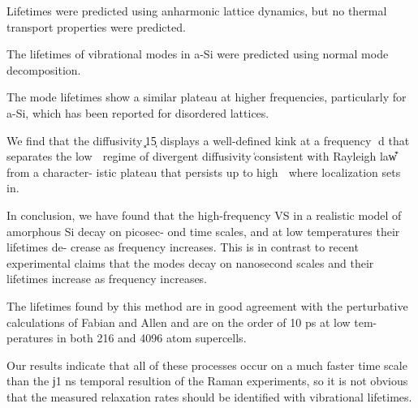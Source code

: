 \documentclass[aps,prb,twocolumn,superscriptaddress,footinbib,amsmath,amssymb,floatfix]{revtex4}
\begin{document}
{Lifetimes were predicted using anharmonic lattice dynamics, but no thermal 
transport properties were predicted.\cite{fabian_anharmonic_1996}

The lifetimes of vibrational modes in a-Si were predicted using normal 
mode decomposition.\cite{he_heat_2011}



The mode lifetimes show a similar 
plateau at higher frequencies, particularly for a-Si, which has been 
reported for disordered lattices.\cite{larkin_predicting_2013}

We
find that the diffusivity ͓15͔ displays a well-defined kink at a
frequency ␻d that separates the low ␻ regime of divergent
diffusivity ͑consistent with Rayleigh law͒ from a character-
istic plateau that persists up to high ␻ where localization sets
in.\cite{vitelli_heat_2010}

In conclusion, we have found that the high-frequency
VS in a realistic model of amorphous Si decay on picosec-
ond time scales, and at low temperatures their lifetimes de-
crease as frequency increases. This is in contrast to recent
experimental claims that the modes decay on nanosecond
scales and their lifetimes increase as frequency increases.
\cite{fabian_anharmonic_1996} 

The lifetimes found by this method
are in good agreement with the perturbative calculations of
Fabian and Allen and are on the order of 10 ps at low tem-
peratures in both 216 and 4096 atom supercells.
\cite{bickham_calculation_1998}

Our results indicate that all of
these processes occur on a much faster time scale than the
ϳ1 ns temporal resultion of the Raman experiments, so it is
not obvious that the measured relaxation rates should be
identified with vibrational lifetimes.
\cite{bickham_numerical_1999}


}
\end{document}

